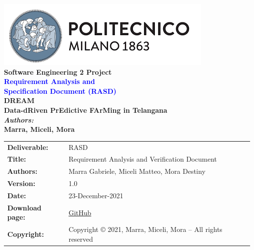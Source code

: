 
\usepackage{longtable} 
\usepackage{multicol}




\setcounter{figure_counter}{1}

\setcounter{table_counter}{1}



\begin{titlepage}

\centering
{\includegraphics[scale=0.7]{Images/PolimiLogo}}\\[3.5cm]

{\textbf{\Large{Software Engineering 2 Project}}}\\ [3.5cm]




\centering
{\textcolor{Blue}{\textbf{\Huge{Requirement Analysis and\\ Specification Document (RASD)}}}} \\ [3.5cm]

{\textbf{{\huge{DREAM}}\\[2mm]\large{Data-dRiven PrEdictive FArMing in Telangana}}}\\ [3.5cm]

{\textbf{\large{\textit{Authors:}}\\[1mm]\Large{Marra, Miceli, Mora}}}\\ [3cm]

\end{titlepage}

\begin{table}[h!]
\begin{tabu} to \textwidth { X[0.3,r,p] X[0.7,l,p] }
\hline

\textbf{Deliverable:} & RASD\\
\textbf{Title:} & Requirement Analysis and Verification Document \\
\textbf{Authors:} & Marra Gabriele, Miceli Matteo, Mora Destiny \\
\textbf{Version:} & 1.0 \\ 
\textbf{Date:} & 23-December-2021 \\
\textbf{Download page:} & \href{https://github.com/gabrielemarra/MarraMiceliMora}{GitHub} \\
\textbf{Copyright:} & Copyright © 2021, Marra, Miceli, Mora – All rights reserved \\
\hline
\end{tabu}
\end{table}




